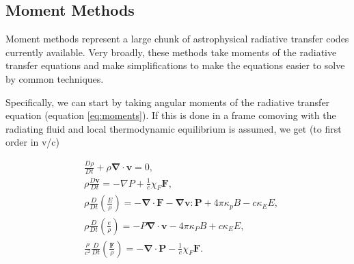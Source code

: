 %


\subsection{Moment Methods}
\label{sec:momentmethods}

Moment methods represent a large chunk of astrophysical radiative transfer codes currently available. Very broadly, these methods take moments of the radiative transfer equations and make simplifications to make the equations easier to solve by common techniques.

Specifically, we can start by taking angular moments of the radiative transfer equation (equation \ref{eq:moments}). If this is done in a frame comoving with the radiating fluid and local thermodynamic equilibrium is assumed, we get (to first order in v/c) \citep{mihalasMihalas84}

\begin{align}
&\frac{D\rho}{Dt} + \rho \mathbf{\nabla \cdot v} = 0,\label{eq:rhd1}\\
&\rho \frac{D\mathbf{v}}{Dt} = -\nabla P + \frac{1}{c}\chi_F \mathbf{F},\label{eq:rhd2}\\
&\rho \frac{D}{Dt}\left(\frac{E}{\rho}\right) = -\mathbf{\nabla \cdot F} - \mathbf{\nabla v:P} + 4\pi\kappa_p B - c\kappa_E E,\label{eq:rhd3}\\
&\rho \frac{D}{Dt}\left(\frac{e}{\rho}\right) = -P\mathbf{\nabla \cdot v} - 4\pi \kappa_P B + c\kappa_E E,\label{eq:rhd4}\\
&\frac{\rho}{c^2}\frac{D}{Dt}\left(\frac{\mathbf{F}}{\rho}\right) = -\mathbf{\nabla \cdot P} - \frac{1}{c} \chi_F \mathbf{F}.\label{eq:rhd5}
\end{align}

